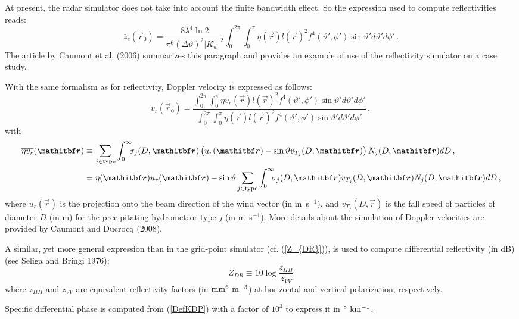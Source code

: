 At present, the radar simulator does not take into account the finite bandwidth effect. So the expression used to compute reflectivities reads:
\begin{equation}
\bar z_e(\vec r_0)=\frac{8\lambda^4\ln2}{\pi^6(\Delta\vartheta)^2|K_w|^2}\int_0^{2\pi}\!\!\!\int_0^\pi\eta(\vec r)l(\vec r)^2f^4(\vartheta',\phi')\sin\vartheta'd\vartheta'd\phi'\,.\label{zefctradiale}
\end{equation}
The article by Caumont et al. (2006) summarizes this paragraph and provides an example of use of the reflectivity simulator on a case study.

With the same formalism as for reflectivity, Doppler velocity is expressed as follows:
\begin{equation}\label{vdopppi}
v_r(\vec r_0)=\frac{\displaystyle\int_0^{2\pi}\!\!\!\int_0^\pi\overline{\eta v_r}(\vec r)l(\vec r)^2f^4(\vartheta',\phi')\sin\vartheta'd\vartheta'd\phi'}{\displaystyle\int_0^{2\pi}\!\!\!\int_0^\pi\eta(\vec r)l(\vec r)^2f^4(\vartheta',\phi')\sin\vartheta'd\vartheta'd\phi'}\,,
\end{equation}
with
\begin{align}
\overline{\eta v_r}(\vec{r})&\equiv\sum_{j\in\rm type}\int_0^\infty\!\!\!\sigma_j(D,\vec{r})\left(u_r(\vec{r})-\sin\vartheta v_{T_j}(D,\vec{r})\right)N_j(D,\vec{r})d D\,,\\
&=\eta(\vec r)u_r(\vec{r})-\sin\vartheta\sum_{j\in\rm type}\int_0^\infty\!\!\!\sigma_j(D,\vec{r})v_{T_j}(D,\vec{r})N_j(D,\vec{r})d D\,,
\end{align}
where $u_r(\vec{r})$ is the projection onto the beam direction of the wind vector (in m~s$^{-1}$), and $v_{T_j}(D,\vec{r})$ is the fall speed of particles of diameter $D$ (in m) for the precipitating hydrometeor type $j$ (in m~s$^{-1}$).
More details about the simulation of Doppler velocities are provided by Caumont and Ducrocq (2008). %

A similar, yet more general expression than in the grid-point simulator (cf. (\ref{Z_{DR}})), is used to compute differential reflectivity (in dB) (see Seliga and Bringi 1976): %
\begin{equation}
Z_{DR}\equiv10\log\frac{z_{HH}}{z_{VV}}
\end{equation}
where $z_{HH}$ and $z_{VV}$ are equivalent reflectivity factors (in $\rm mm^6~m^{-3}$) at horizontal and vertical polarization, respectively.

Specific differential phase is computed from (\ref{DefKDP}) with a factor of $10^{3}$ to express it in $^\circ\rm~km^{-1}$.

